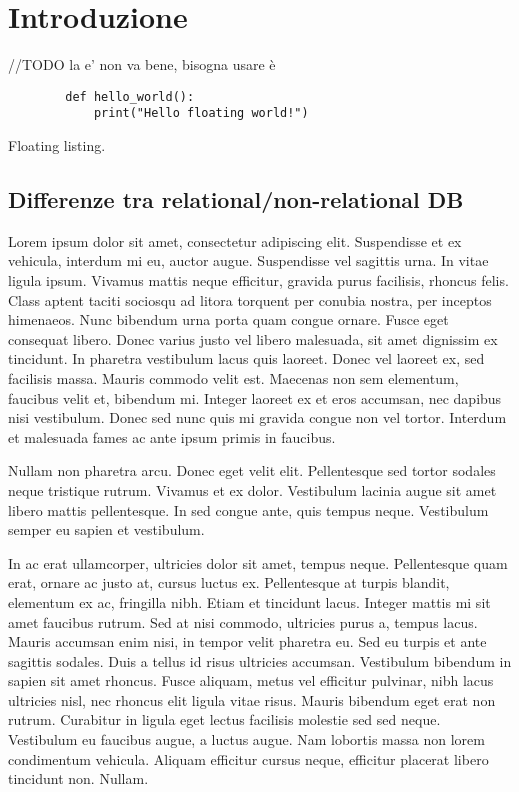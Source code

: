 \chapter{Introduzione}

//TODO la e' non va bene, bisogna usare è

\begin{listing}
    \begin{verbatim}
        def hello_world():
            print("Hello floating world!")
    \end{verbatim}
    \caption{Floating listing.}
    \label{lst:hello}
\end{listing}

\section{Differenze tra relational/non-relational DB}
Lorem ipsum dolor sit amet, consectetur adipiscing elit. Suspendisse et ex vehicula, interdum mi eu, auctor augue. Suspendisse vel sagittis urna. In vitae ligula ipsum. Vivamus mattis neque efficitur, gravida purus facilisis, rhoncus felis. Class aptent taciti sociosqu ad litora torquent per conubia nostra, per inceptos himenaeos. Nunc bibendum urna porta quam congue ornare. Fusce eget consequat libero. Donec varius justo vel libero malesuada, sit amet dignissim ex tincidunt. In pharetra vestibulum lacus quis laoreet. Donec vel laoreet ex, sed facilisis massa. Mauris commodo velit est. Maecenas non sem elementum, faucibus velit et, bibendum mi. Integer laoreet ex et eros accumsan, nec dapibus nisi vestibulum. Donec sed nunc quis mi gravida congue non vel tortor. Interdum et malesuada fames ac ante ipsum primis in faucibus.

Nullam non pharetra arcu. Donec eget velit elit. Pellentesque sed tortor sodales neque tristique rutrum. Vivamus et ex dolor. Vestibulum lacinia augue sit amet libero mattis pellentesque. In sed congue ante, quis tempus neque. Vestibulum semper eu sapien et vestibulum.

In ac erat ullamcorper, ultricies dolor sit amet, tempus neque. Pellentesque quam erat, ornare ac justo at, cursus luctus ex. Pellentesque at turpis blandit, elementum ex ac, fringilla nibh. Etiam et tincidunt lacus. Integer mattis mi sit amet faucibus rutrum. Sed at nisi commodo, ultricies purus a, tempus lacus. Mauris accumsan enim nisi, in tempor velit pharetra eu. Sed eu turpis et ante sagittis sodales. Duis a tellus id risus ultricies accumsan. Vestibulum bibendum in sapien sit amet rhoncus. Fusce aliquam, metus vel efficitur pulvinar, nibh lacus ultricies nisl, nec rhoncus elit ligula vitae risus. Mauris bibendum eget erat non rutrum. Curabitur in ligula eget lectus facilisis molestie sed sed neque. Vestibulum eu faucibus augue, a luctus augue. Nam lobortis massa non lorem condimentum vehicula. Aliquam efficitur cursus neque, efficitur placerat libero tincidunt non. Nullam.

